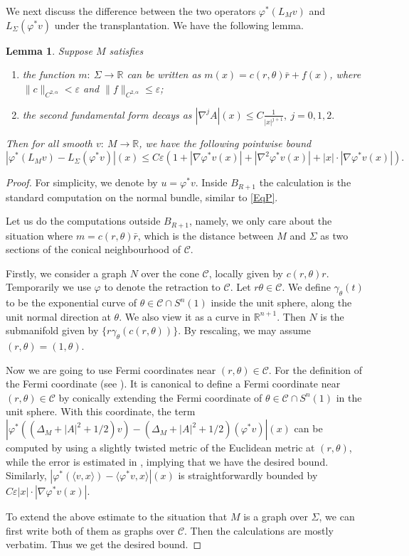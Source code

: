\documentclass[12pt]{amsart}
\numberwithin{equation}{section}
\newtheorem{lemma}[theorem]{Lemma}
\numberwithin{equation}{section}
\newcommand{\eps}{\varepsilon}
\newcommand{\al}{\alpha}
\newcommand{\cC}{\mathcal{C}}
\newcommand{\R}{\mathbb{R}}
\begin{document}
	
	We next discuss the difference between the two operators $\varphi^*(L_{M}v)$ and $L_{\Sigma}(\varphi^*v)$ under the transplantation. We have the following lemma.
	\begin{lemma}\label{LmAppP} Suppose $M$ satisfies
		\begin{enumerate}
			\item the function $m:\ \Sigma\to \R$ can be written as $ m(x)=c(r,\theta)\bar r+f(x)$, where $\|c\|_{C^{2,\al}}<\eps$ and $\|f\|_{C^{2,\al}}\leq \eps $;
			\item the second fundamental form decays as $|\nabla^j A|(x)\leq C\frac{1}{|x|^{j+1}},\ j=0,1,2.$
		\end{enumerate}
		Then for all smooth $v:\ M\to \R$, we have the following pointwise bound $$|\varphi^*(L_{M}v)-L_{\Sigma}(\varphi^*v)|(x)\leq C\eps(1+|\nabla \varphi^*v(x)|+|\nabla^2 \varphi^*v(x)|+|x|\cdot |\nabla \varphi^*v(x)|).$$
	\end{lemma}
	
	\begin{proof}
		For simplicity, we denote by $u=\varphi^*v$. Inside $B_{R+1}$ the calculation is the standard computation on the normal bundle, similar to \eqref{EqP}. 
		
		Let us do the computations outside $B_{R+1}$, namely, we only care about the situation where $m=c(r,\theta)\bar{r}$, which is the distance between $M$ and $\Sigma$ as two sections of the conical neighbourhood of $\cC$.
		
		Firstly, we consider a graph $N$ over the cone $\cC$, locally given by $c(r,\theta)r$. Temporarily we use $\varphi$ to denote the retraction to $\cC$. Let $r\theta\in \cC$. We define $\gamma_\theta(t)$ to be the exponential curve of $\theta\in \cC\cap S^n(1)$ inside the unit sphere, along the unit normal direction at $\theta$. We also view it as a curve in $\R^{n+1}$. Then $N$ is the submanifold given by $\{r\gamma_\theta(c(r,\theta))\}$. By rescaling, we may assume $(r,\theta)=(1,\theta)$.
		
		Now we are going to use Fermi coordinates near $(r,\theta)\in\cC$. For the definition of the Fermi coordinate (see \cite[Lemma A.2]{LZ}). It is canonical to define a Fermi coordinate near $(r,\theta)\in \cC$ by conically extending the Fermi coordinate of $\theta\in\cC\cap S^n(1)$ in the unit sphere. With this coordinate, the term $|\varphi^*((\Delta_{M}+|A|^2+1/2)v)-(\Delta_{M}+|A|^2+1/2)(\varphi^*v)|(x)$ can be computed by using a slightly twisted metric of the Euclidean metric at $(r,\theta)$, while the error is estimated in \cite[Appendix A]{LZ}, implying that we have the desired bound. Similarly, $|\varphi^*(\langle v,x\rangle)-\langle \varphi^*v,x\rangle|(x)$ is straightforwardly bounded by $C\eps |x|\cdot |\nabla \varphi^*v(x)|$. 
		
		To extend the above estimate to the situation that $M$ is a graph over $\Sigma$, we can first write both of them as graphs over $\cC$. Then the calculations are mostly verbatim. Thus we get the desired bound.
	\end{proof}
	
\end{document}
